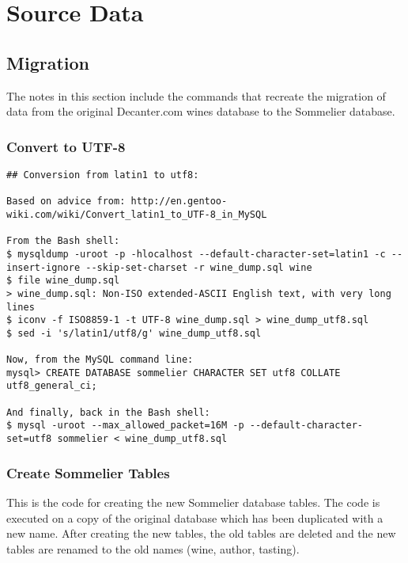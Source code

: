 \section{Source Data} \label{app:data}

\subsection{Migration} \label{app:datamigration}

The notes in this section include the commands that recreate the migration of data from the original Decanter.com wines database to the Sommelier database.

\subsubsection{Convert to UTF-8}

\begin{verbatim}
## Conversion from latin1 to utf8:

Based on advice from: http://en.gentoo-wiki.com/wiki/Convert_latin1_to_UTF-8_in_MySQL

From the Bash shell:
$ mysqldump -uroot -p -hlocalhost --default-character-set=latin1 -c --insert-ignore --skip-set-charset -r wine_dump.sql wine
$ file wine_dump.sql
> wine_dump.sql: Non-ISO extended-ASCII English text, with very long lines
$ iconv -f ISO8859-1 -t UTF-8 wine_dump.sql > wine_dump_utf8.sql
$ sed -i 's/latin1/utf8/g' wine_dump_utf8.sql

Now, from the MySQL command line:
mysql> CREATE DATABASE sommelier CHARACTER SET utf8 COLLATE utf8_general_ci;

And finally, back in the Bash shell:
$ mysql -uroot --max_allowed_packet=16M -p --default-character-set=utf8 sommelier < wine_dump_utf8.sql

\end{verbatim}

\subsubsection{Create Sommelier Tables}

This is the code for creating the new Sommelier database tables. The code is executed on a copy of the original database which has been duplicated with a new name. After creating the new tables, the old tables are deleted and the new tables are renamed to the old names (wine, author, tasting).

